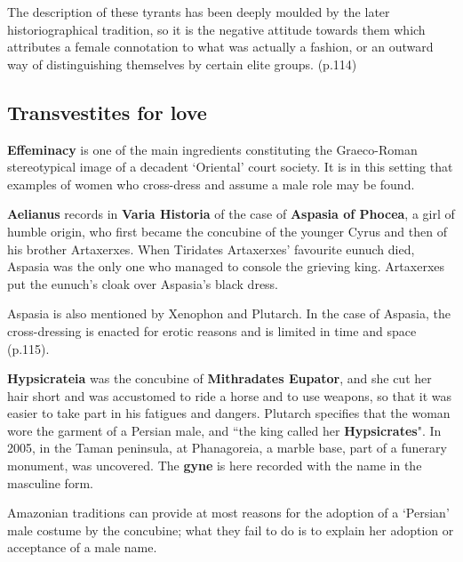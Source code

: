 \begin{nte}
    The description of these tyrants has been deeply moulded by the later historiographical tradition, so it is the negative attitude towards them which attributes a female connotation to what was actually a fashion, or an outward way of distinguishing themselves by certain elite groups. (p.114)
\end{nte}

\subsection{Transvestites for love}

\textbf{Effeminacy} is one of the main ingredients constituting the Graeco-Roman stereotypical image of a decadent `Oriental' court society. It is in this setting that examples of women who cross-dress and assume a male role may be found.

\begin{eg}
    \textbf{Aelianus} records in \textbf{Varia Historia} of the case of \textbf{Aspasia of Phocea}, a girl of humble origin, who first became the concubine of the younger Cyrus and then of his brother Artaxerxes. When Tiridates Artaxerxes' favourite eunuch died, Aspasia was the only one who managed to console the grieving king. Artaxerxes put the eunuch's cloak over Aspasia's black dress.
\end{eg}

Aspasia is also mentioned by Xenophon and Plutarch. In the case of Aspasia, the cross-dressing is enacted for erotic reasons and is limited in time and space (p.115).

\begin{eg}
    \textbf{Hypsicrateia} was the concubine of \textbf{Mithradates Eupator}, and she cut her hair short and was accustomed to ride a horse and to use weapons, so that it was easier to take part in his fatigues and dangers. Plutarch specifies that the woman wore the garment of a Persian male, and ``the king called her \textbf{Hypsicrates}". In 2005, in the Taman peninsula, at Phanagoreia, a marble base, part of a funerary monument, was uncovered. The \textbf{gyne} is here recorded with the name in the masculine form.

    Amazonian traditions can provide at most reasons for the adoption of a `Persian' male costume by the concubine; what they fail to do is to explain her adoption or acceptance of a male name.
\end{eg}



